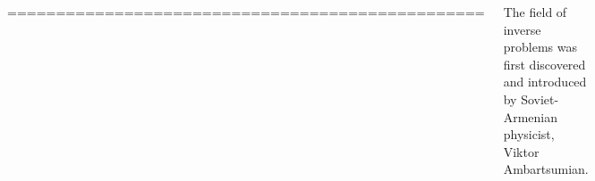 \documentclass[a0paper,25pt]{tikzposter} %
\begin{document}
\begin{columns}
{%

=================================================

The field of inverse problems was first discovered and introduced by Soviet-Armenian physicist, Viktor Ambartsumian.

}
\end{columns}
\end{document}
